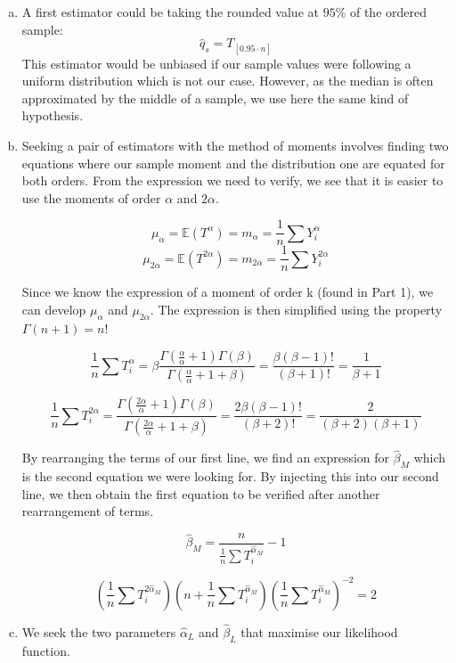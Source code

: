 \documentclass[a4paper]{article}
\begin{document}
\begin{enumerate}[(a)]

\item A first estimator could be taking the rounded value at $ 95\% $ of the ordered sample:
$$\hat{q}_s = T_{[0.95\cdot n]}$$
This estimator would be unbiased if our sample values were following a uniform distribution which is not our case. However, as the median is often approximated by the middle of a sample, we use here the same kind of hypothesis.

\item Seeking a pair of estimators with the method of moments involves finding two equations where our sample moment and the distribution one are equated for both orders. From the expression we need to verify, we see that it is easier to use the moments of order $\alpha$ and $2\alpha$.

$$\mu_\alpha = \mathbb{E}(T^\alpha) = m_\alpha = \frac{1}{n}\sum Y_{i}^{\alpha}$$
$$\mu_{2\alpha} = \mathbb{E}(T^{2\alpha})= m_{2\alpha} = \frac{1}{n}\sum Y_{i}^{2\alpha}$$

Since we know the expression of a moment of order k (found in Part 1), we can develop $\mu_\alpha$ and $\mu_{2\alpha}$. The expression is then simplified using the property $\Gamma(n+1) = n!$

$$\frac{1}{n}\sum T_i^\alpha = \beta \frac{\Gamma(\frac{\alpha}{\alpha}+1)\Gamma(\beta)}{\Gamma(\frac{\alpha}{\alpha}+1+\beta)} = \frac{\beta(\beta-1)!}{(\beta+1)!} = \frac{1}{\beta+1}$$

$$\frac{1}{n}\sum T_i^{2\alpha} = \frac{\Gamma(\frac{2\alpha}{\alpha}+1)\Gamma(\beta)}{\Gamma(\frac{2\alpha}{\alpha}+1+\beta)} = \frac{2\beta(\beta-1)!}{(\beta+2)!} = \frac{2}{(\beta+2)(\beta+1)}$$

By rearranging the terms of our first line, we find an expression for $\hat{\beta}_M$ which is the second equation we were looking for. By injecting this into our second line, we then obtain the first equation to be verified after another rearrangement of terms.

$$\hat{\beta}_M = \frac{n}{\frac{1}{n}\sum T_i^{\hat{\alpha}_M}} - 1$$

$$\left ( \frac{1}{n}\sum T_i^{2\hat{\alpha}_M} \right )  \left (n + \frac{1}{n}\sum T_i^{\hat{\alpha}_M} \right )  \left ( \frac{1}{n}\sum T_i^{\hat{\alpha}_M} \right )^{-2} = 2$$

\item We seek the two parameters $\hat{\alpha}_L$ and $\hat{\beta}_L$ that maximise our likelihood function. 


\end{enumerate}
\end{document}

